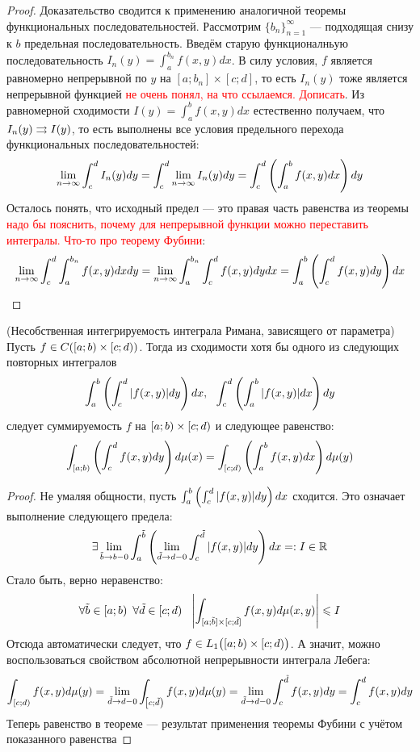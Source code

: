 \begin{proof}
	Доказательство сводится к применению аналогичной теоремы функциональных последовательностей. Рассмотрим $\{b_n\}_{n = 1}^\infty$ --- подходящая снизу к $b$ предельная последовательность. Введём старую функционалньую последовательность $I_n(y) = \int_a^{b_n} f(x, y)dx$. В силу условия, $f$ является равномерно непрерывной по $y$ на $[a; b_n] \times [c; d]$, то есть $I_n(y)$ тоже является непрерывной функцией \textcolor{red}{не очень понял, на что ссылаемся. Дописать}. Из равномерной сходимости $I(y) = \int_a^b f(x, y)dx$ естественно получаем, что $I_n(y) \rightrightarrows I(y)$, то есть выполнены все условия предельного перехода функциональных последовательностей:
	\[
		\lim_{n \to \infty} \int_c^d I_n(y)dy = \int_c^d \lim_{n \to \infty} I_n(y)dy = \int_c^d \left(\int_a^b f(x, y)dx\right)dy
	\]
	Осталось понять, что исходный предел --- это правая часть равенства из теоремы \textcolor{red}{надо бы пояснить, почему для непрерывной функции можно переставить интегралы. Что-то про теорему Фубини}:
	\[
		\lim_{n \to \infty} \int_c^d \int_a^{b_n} f(x, y)dxdy = \lim_{n \to \infty} \int_a^{b_n} \int_c^d f(x, y)dydx = \int_a^b \left(\int_c^d f(x, y)dy\right)dx
	\]
\end{proof}

\begin{theorem} (Несобственная интегрируемость интеграла Римана, зависящего от параметра)
	Пусть $f \in C(\left[a; b\right) \times \left[c; d\right))$. Тогда из сходимости хотя бы одного из следующих повторных интегралов
	\[
		\int_a^b \left(\int_c^d |f(x, y)|dy\right)dx,\ \ \int_c^d \left(\int_a^b |f(x, y)|dx\right)dy
	\]
	следует суммируемость $f$ на $\left[a; b\right) \times \left[c; d\right)$ и следующее равенство:
	\[
		\int_{\left[a; b\right)} \left(\int_c^d f(x, y)dy\right)d\mu(x) = \int_{\left[c; d\right)} \left(\int_a^b f(x, y)dx\right)d\mu(y)
	\]
\end{theorem}

\begin{proof}
	Не умаляя общности, пусть $\int_a^b \left(\int_c^d |f(x, y)|dy\right)dx$ сходится. Это означает выполнение следующего предела:
	\[
		\exists \lim_{\tilde{b} \to b-0} \int_a^{\tilde{b}} \left(\lim_{\tilde{d} \to d-0} \int_c^{\tilde{d}} |f(x, y)|dy\right)dx =: I \in \mathbb{R}
	\]
	Стало быть, верно неравенство:
	\[
		\forall \tilde{b} \in \left[a; b\right)\ \forall \tilde{d} \in \left[c; d\right)\ \ \left|\int_{[a; \tilde{b}] \times [c; \tilde{d}]} f(x, y)d\mu(x, y)\right| \leqslant I
	\]
	Отсюда автоматически следует, что $f \in L_1\big(\!\left[a; b\right) \times \left[c; d\right)\!\big)$. А значит, можно воспользоваться свойством абсолютной непрерывности интеграла Лебега:
	\[
		\int_{\left[c; d\right)} f(x, y)d\mu(y) = \lim_{\tilde{d} \to d-0} \int_{\left[c; \tilde{d}\right)} f(x, y)d\mu(y) = \lim_{\tilde{d} \to d-0} \int_c^{\tilde{d}} f(x, y)dy = \int_c^d f(x, y)dy
	\]
	Теперь равенство в теореме --- результат применения теоремы Фубини с учётом показанного равенства
\end{proof}

